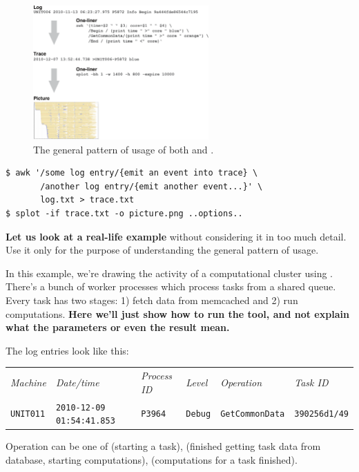 \documentclass{article}
\begin{document}
\begin{figure}[t]
\center
\includegraphics[width=0.6\textwidth]{general-usage.pdf}
\caption{The general pattern of usage of both \timeplot{} and \splot{}.}
\label{fig:general-usage}
\end{figure}

\begin{verbatim}
$ awk '/some log entry/{emit an event into trace} \
       /another log entry/{emit another event...}' \
       log.txt > trace.txt
$ splot -if trace.txt -o picture.png ..options..
\end{verbatim}

\textbf{Let us look at a real-life example} without considering it in too much detail. Use it only for the purpose of understanding the general pattern of usage.
\pagebreak


In this example, we're drawing the activity of a computational cluster using \splot{}. There's a bunch of worker processes which process tasks from a shared queue. Every task has two stages: 1) fetch data from memcached and 2) run computations. \textbf{Here we'll just show how to run the tool, and not explain what the parameters or even the result mean.}

The log entries look like this:

\begin{tabular}{llllll}
\emph{Machine} & \emph{Date/time} & \emph{Process ID} & \emph{Level} & \emph{Operation} & \emph{Task ID} \\
\footnotesize{\texttt{UNIT011}} & \footnotesize{\texttt{2010-12-09 01:54:41.853}} & \footnotesize{\texttt{P3964}} & \footnotesize{\texttt{Debug}} & \footnotesize{\texttt{GetCommonData}} & \footnotesize{\texttt{390256d1/49}} \\
\end{tabular}

Operation can be one of  (starting a task),  (finished getting task data from database, starting computations),  (computations for a task finished).
\end{document}
